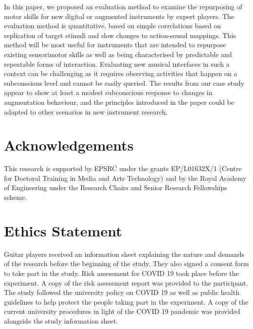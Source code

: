 \documentclass[sigconf]{nimeart}
\begin{document}
In this paper, we proposed an evaluation method to examine the repurposing of motor skills for new digital or augmented instruments by expert players. The evaluation method is quantitative, based on simple correlations based on replication of target stimuli and slow changes to action-sound mappings. This method will be most useful for instruments that are intended to repurpose existing sensorimotor skills as well as being characterised by predictable and repeatable forms of interaction. Evaluating new musical interfaces in such a context can be challenging as it requires observing activities that happen on a subconscious level and cannot be easily queried. The results from our case study appear to show at least a modest subconscious response to changes in augmentation behaviour, and the principles introduced in the paper could be adapted to other scenarios in new instrument research.

\section{Acknowledgements~}\label{acknowledgements}

This research is supported by EPSRC under the grants EP/L01632X/1 (Centre for Doctoral Training in Media and Arts Technology) and by the Royal Academy of Engineering under the Research Chairs and Senior Research Fellowships scheme.

\section{Ethics Statement}\label{ethics-statement}

Guitar players received an information sheet explaining the nature and demands of the research before the beginning of the study. They also signed a consent form to take part in the study. Risk assessment for COVID 19 took place before the experiment. A copy of the risk assessment report was provided to the participant. The study followed the university policy on COVID 19 as well as public health guidelines to help protect the people taking part in the experiment. A copy of the current university procedures in light of the COVID 19 pandemic was provided alongside the study information sheet.



\end{document}
